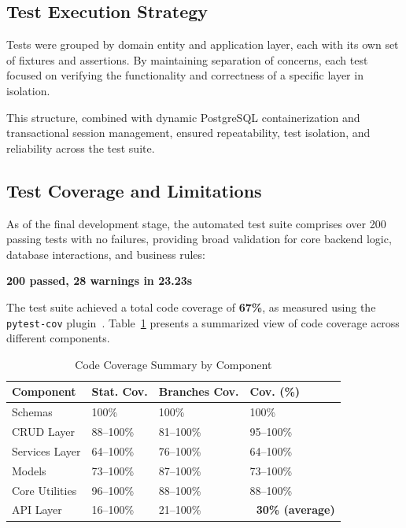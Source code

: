 \subsection{Test Execution Strategy}

Tests were grouped by domain entity and application layer, each with its own set of fixtures and assertions. By maintaining separation of concerns, each test focused on verifying the functionality and correctness of a specific layer in isolation.

This structure, combined with dynamic PostgreSQL containerization and transactional session management, ensured repeatability, test isolation, and reliability across the test suite. 


\subsection{Test Coverage and Limitations}

As of the final development stage, the automated test suite comprises over 200 passing tests with no failures, providing broad validation for core backend logic, database interactions, and business rules:

\begin{center}
\textbf{200 passed, 28 warnings in 23.23s}
\end{center}

The test suite achieved a total code coverage of \textbf{67\%}, as measured using the \texttt{pytest-cov} plugin~\cite{PythonCoverage}. Table~\ref{tab:coverage-summary} presents a summarized view of code coverage across different components.

\begin{table}[H]
  \centering
  \begin{tabularx}{\textwidth}{|l|X|X|X|}
  \hline
  \textbf{Component} & \textbf{Stat. Cov.} & \textbf{Branches Cov.} & \textbf{Cov. (\%)} \\
  \hline
  Schemas & 100\% & 100\% & 100\% \\
  \hline
  CRUD Layer & 88--100\% & 81--100\% & 95--100\% \\
  \hline
  Services Layer & 64--100\% & 76--100\% & 64--100\% \\
  \hline
  Models & 73--100\% & 87--100\% & 73--100\% \\
  \hline
  Core Utilities & 96--100\% & 88--100\% & 88--100\% \\
  \hline
  API Layer & 16--100\% & 21--100\% & \textbf{~30\% (average)} \\
  \hline
  \end{tabularx}
  \caption{Code Coverage Summary by Component}
  \label{tab:coverage-summary}
  \end{table}

